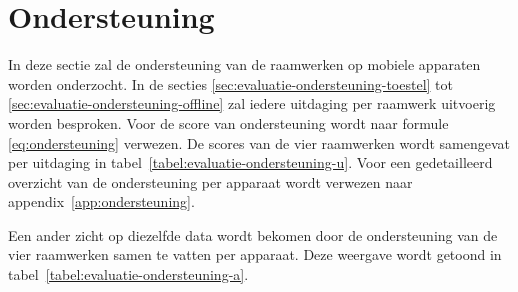 \section{Ondersteuning}
\label{sec:evaluatie-ondersteuning}

In deze sectie zal de ondersteuning van de raamwerken op mobiele apparaten worden onderzocht.
In de secties \ref{sec:evaluatie-ondersteuning-toestel} tot \ref{sec:evaluatie-ondersteuning-offline} zal iedere uitdaging per raamwerk uitvoerig worden besproken.
Voor de score van ondersteuning wordt naar formule \ref{eq:ondersteuning} verwezen.
De scores van de vier raamwerken wordt samengevat per uitdaging in tabel~\ref{tabel:evaluatie-ondersteuning-u}.
Voor een gedetailleerd overzicht van de ondersteuning per apparaat wordt verwezen naar appendix~\ref{app:ondersteuning}.

\begin{table}
\centering
\resizebox{14cm}{!} {
}
\caption{Ondersteuning per uitdaging.}
\label{tabel:evaluatie-ondersteuning-u}
\end{table}

Een ander zicht op diezelfde data wordt bekomen door de ondersteuning van de vier raamwerken samen te vatten per apparaat.
Deze weergave wordt getoond in tabel~\ref{tabel:evaluatie-ondersteuning-a}.


